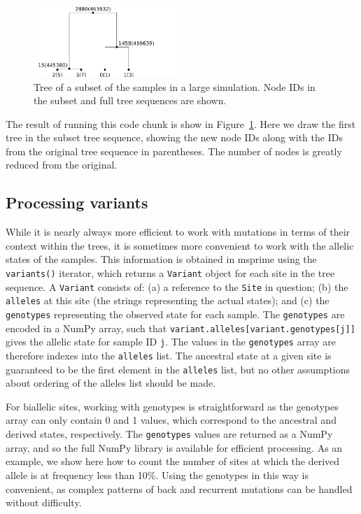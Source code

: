\documentclass[graybox]{svmult}
\begin{document}
\begin{figure}[t]
\centering
\includegraphics[width=0.48\textwidth]{images/plot_13.pdf}
\caption{\label{fig-tree-subset} Tree of a subset of the samples in a large
simulation. Node IDs in the subset and full tree sequences are shown.}
\end{figure}

The result of running this code chunk is show in Figure~\ref{fig-tree-subset}.
Here we draw the first tree in the subset tree sequence, showing the new
node IDs along with the IDs from the original tree sequence in
parentheses. The number of nodes is greatly reduced from the original.

\subsection{Processing variants}\label{processing-variants}

While it is nearly always more efficient to work with mutations in terms
of their context within the trees, it is sometimes more convenient to
work with the allelic states of the samples. This information is
obtained in msprime using the \texttt{variants()} iterator, which
returns a \texttt{Variant} object for each site in the tree sequence. A
\texttt{Variant} consists of: (a) a reference to the \texttt{Site} in question;
(b) the \texttt{alleles} at this site (the strings representing the
actual states); and (c) the \texttt{genotypes} representing the observed
state for each sample. The \texttt{genotypes} are encoded in a NumPy
array, such that \texttt{variant.alleles{[}variant.genotypes{[}j{]}{]}}
gives the allelic state for sample ID \texttt{j}. The values in the
\texttt{genotypes} array are therefore indexes into the \texttt{alleles}
list. The ancestral state at a given site is guaranteed to be the first
element in the \texttt{alleles} list, but no other assumptions about
ordering of the alleles list should be made.

For biallelic sites, working with genotypes is straightforward as the
genotypes array can only contain 0 and 1 values, which correspond to
the ancestral and derived states, respectively. The \texttt{genotypes}
values are returned as a NumPy array, and so the full NumPy library is
available for efficient processing. As an example, we show here how to
count the number of sites at which the derived allele is at frequency
less than 10\%. Using the genotypes in this way is convenient, as
complex patterns of back and recurrent mutations can be handled without
difficulty.
\end{document}
